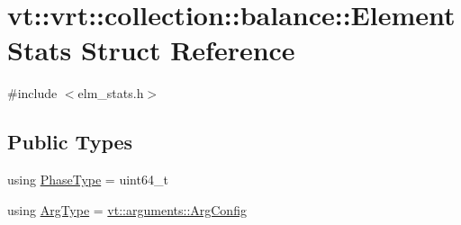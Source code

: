 \hypertarget{structvt_1_1vrt_1_1collection_1_1balance_1_1_element_stats}{}\section{vt\+:\+:vrt\+:\+:collection\+:\+:balance\+:\+:Element\+Stats Struct Reference}
\label{structvt_1_1vrt_1_1collection_1_1balance_1_1_element_stats}


{\ttfamily \#include $<$elm\+\_\+stats.\+h$>$}

\subsection*{Public Types}
\begin{DoxyCompactItemize}
\item 
using \hyperlink{structvt_1_1vrt_1_1collection_1_1balance_1_1_element_stats_a6edee983bb2ae96a341763520af33c66}{Phase\+Type} = uint64\+\_\+t
\item 
using \hyperlink{structvt_1_1vrt_1_1collection_1_1balance_1_1_element_stats_a0c7e7b8fa38003b72320906f18a6ca71}{Arg\+Type} = \hyperlink{structvt_1_1arguments_1_1_arg_config}{vt\+::arguments\+::\+Arg\+Config}
\end{DoxyCompactItemize}
